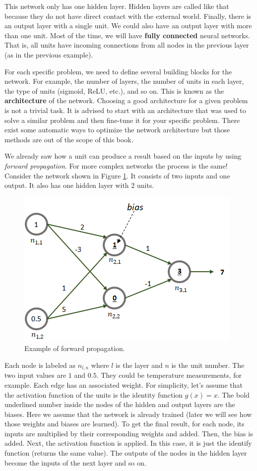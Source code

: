 \documentclass[
  11pt,
]{krantz}
\makeatletter
\newenvironment{kframe}{%
\medskip{}
\setlength{\fboxsep}{.8em}
 \def\at@end@of@kframe{}%
 \ifinner\ifhmode%
  \def\at@end@of@kframe{\end{minipage}}%
  \begin{minipage}{\columnwidth}%
 \fi\fi%
 \def\FrameCommand##1{\hskip\@totalleftmargin \hskip-\fboxsep
 \colorbox{shadecolor}{##1}\hskip-\fboxsep
     \hskip-\linewidth \hskip-\@totalleftmargin \hskip\columnwidth}%
 \MakeFramed {\advance\hsize-\width
   \@totalleftmargin\z@ \linewidth\hsize
   \@setminipage}}%
 {\par\unskip\endMakeFramed%
 \at@end@of@kframe}
\newenvironment{rmdblock}[1]
  {
  \begin{itemize}
  \renewcommand{\labelitemi}{
    \raisebox{-.7\height}[0pt][0pt]{
      {\setkeys{Gin}{width=3em,keepaspectratio}\texttt{[image: images/icons/\#1]}}
    }
  }
  \setlength{\fboxsep}{1em}
  \begin{kframe}
  \item
  }
  {
  \end{kframe}
  \end{itemize}
  }
\newenvironment{rmdinfo}
  {\begin{rmdblock}{info}}
  {\end{rmdblock}}
\makeatother
\begin{document}
This network only has one hidden layer. Hidden layers are called like that because they do not have direct contact with the external world. Finally, there is an output layer with a single unit. We could also have an output layer with more than one unit. Most of the time, we will have \textbf{fully connected} neural networks. That is, all units have incoming connections from all nodes in the previous layer (as in the previous example).

\begin{rmdinfo}
For each specific problem, we need to define several building blocks for the network. For example, the number of layers, the number of units in each layer, the type of units (sigmoid, ReLU, etc.), and so on. This is known as the \textbf{architecture} of the network. Choosing a good architecture for a given problem is not a trivial task. It is advised to start with an architecture that was used to solve a similar problem and then fine-tune it for your specific problem. There exist some automatic ways to optimize the network architecture but those methods are out of the scope of this book.
\end{rmdinfo}

We already saw how a unit can produce a result based on the inputs by using \emph{forward propagation}. For more complex networks the process is the same! Consider the network shown in Figure \ref{fig:nnForward}. It consists of two inputs and one output. It also has one hidden layer with \(2\) units.

\begin{figure}

{\centering \includegraphics[width=0.5\linewidth]{images/nn_forward} 

}

\caption{Example of forward propagation.}\label{fig:nnForward}
\end{figure}

Each node is labeled as \(n_{l,n}\) where \(l\) is the layer and \(n\) is the unit number.
The two input values are \(1\) and \(0.5\). They could be temperature measurements, for example. Each edge has an associated weight. For simplicity, let's assume that the activation function of the units is the identity function \(g(x)=x\). The bold underlined number inside the nodes of the hidden and output layers are the biases. Here we assume that the network is already trained (later we will see how those weights and biases are learned). To get the final result, for each node, its inputs are multiplied by their corresponding weights and added. Then, the bias is added. Next, the activation function is applied. In this case, it is just the identify function (returns the same value). The outputs of the nodes in the hidden layer become the inputs of the next layer and so on.
\end{document}
